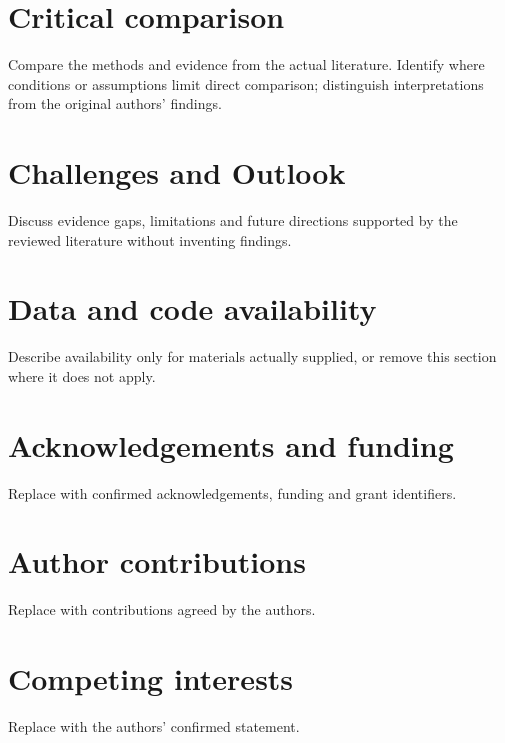 \documentclass[11pt]{article}
\begin{document}
\section{Critical comparison}\label{sec:comparison}
Compare the methods and evidence from the actual literature. Identify where
conditions or assumptions limit direct comparison; distinguish interpretations
from the original authors' findings.
\section{Challenges and Outlook}\label{sec:outlook}
Discuss evidence gaps, limitations and future directions supported by the
reviewed literature without inventing findings.
\section*{Data and code availability}
Describe availability only for materials actually supplied, or remove this
section where it does not apply.
\section*{Acknowledgements and funding}
Replace with confirmed acknowledgements, funding and grant identifiers.
\section*{Author contributions}
Replace with contributions agreed by the authors.
\section*{Competing interests}
Replace with the authors' confirmed statement.


\end{document}
